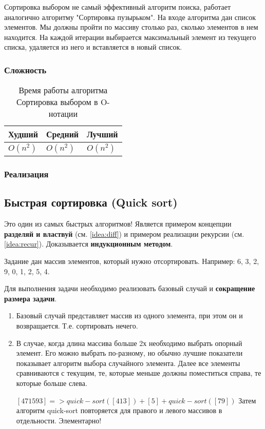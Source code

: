 		Сортировка выбором не самый эффективный алгоритм поиска, работает аналогично алгоритму "Сортировка пузырьком". 
		На входе алгоритма дан список элементов. Мы должны пройти по массиву столько раз, сколько элементов в нем находится. На каждой итерации выбирается максимальный элемент из текущего списка, удаляется из него и вставляется в новый список.
		
		\subsubsection{Сложность}
		
\begin{table}[h!]
\caption{Время работы алгоритма Сортировка выбором в O-нотации}
\begin{tabular}{|l|l|l|}
\hline
Худший & Средний & Лучший \\ \hline
$ O(n^{2}) $ & $ O(n^{2}) $ & $ O(n^{2}) $ \\\hline
\end{tabular}
\end{table}

		\subsubsection{Реализация}
		
\linenumbers
{}
\nolinenumbers	

		\subsection{Быстрая сортировка (Quick sort) \label{sort:quick}}
		Это один из самых быстрых алгоритмов! Является примером концепции \textbf{разделяй и властвуй} (см. \ref{idea:diff}) и примером реализации рекурсии (см. \ref{idea:recur}). Доказывается \textbf{индукционным методом}.
		
		Задание дан массив элементов, который нужно отсортировать. Например: 6, 3, 2, 9, 0, 1, 2, 5, 4.
		
		Для выполнения задачи необходимо реализовать базовый случай и \textbf{сокращение размера задачи}. 
		\begin{enumerate}
		\item Базовый случай представляет массив из одного элемента, при этом он и возвращается. Т.е. сортировать нечего.
		\item В случае, когда длина массива больше 2х необходимо выбрать опорный элемент. Его можно выбрать по-разному, но обычно лучшие показатели показывает алгоритм выбора случайного элемента. Далее все элементы сравниваются с текущим, те, которые меньше должны поместиться справа, те которые больше слева.
		
		$ [4 7 1 5 9 3] => quick-sort([4 1 3]) + [5] + quick-sort([7 9]) $
		Затем алгоритм quick-sort повторяется для правого и левого массивов в отдельности. Элементарно!
		\end{enumerate}

